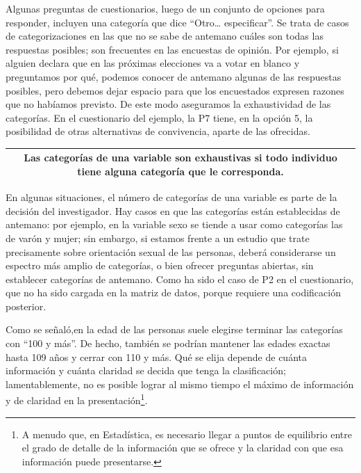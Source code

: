 \documentclass[]{book}
\let\rmarkdownfootnote\footnote%
\def\footnote{\protect\rmarkdownfootnote}
\begin{document}
Algunas preguntas de cuestionarios, luego de un conjunto de opciones para responder, incluyen una categoría que dice ``Otro\ldots{} especificar''. Se trata de casos de categorizaciones en las que no se sabe de antemano cuáles son todas las respuestas posibles; son frecuentes en las encuestas de opinión. Por ejemplo, si alguien declara que en las próximas elecciones va a votar en blanco y preguntamos por qué, podemos conocer de antemano algunas de las respuestas posibles, pero debemos dejar espacio para que los encuestados expresen razones que no habíamos previsto. De este modo aseguramos la exhaustividad de las categorías. En el cuestionario del ejemplo, la P7 tiene, en la opción 5, la posibilidad de otras alternativas de convivencia, aparte de las ofrecidas.

\begin{longtable}[]{@{}c@{}}
\toprule
\endhead
\begin{minipage}[t]{0.97\columnwidth}\centering
Las categorías de una variable son \textbf{exhaustivas} si todo individuo tiene alguna categoría que le corresponda.\strut
\end{minipage}\tabularnewline
\bottomrule
\end{longtable}

En algunas situaciones, el número de categorías de una variable es parte de la decisión del investigador. Hay casos en que las categorías están establecidas de antemano: por ejemplo, en la variable sexo se tiende a usar como categorías las de varón y mujer; sin embargo, si estamos frente a un estudio que trate precisamente sobre orientación sexual de las personas, deberá considerarse un espectro más amplio de categorías, o bien ofrecer preguntas abiertas, sin establecer categorías de antemano. Como ha sido el caso de P2 en el cuestionario, que no ha sido cargada en la matriz de datos, porque requiere una codificación posterior.

Como se señaló,en la edad de las personas suele elegirse terminar las categorías con ``100 y más''. De hecho, también se podrían mantener las edades exactas hasta 109 años y cerrar con 110 y más. Qué se elija depende de cuánta información y cuánta claridad se decida que tenga la clasificación; lamentablemente, no es posible lograr al mismo tiempo el máximo de información y de claridad en la presentación\footnote{A menudo que, en Estadística, es necesario llegar a puntos de equilibrio entre el grado de detalle de la información que se ofrece y la claridad con que esa información puede presentarse.}.
\end{document}
